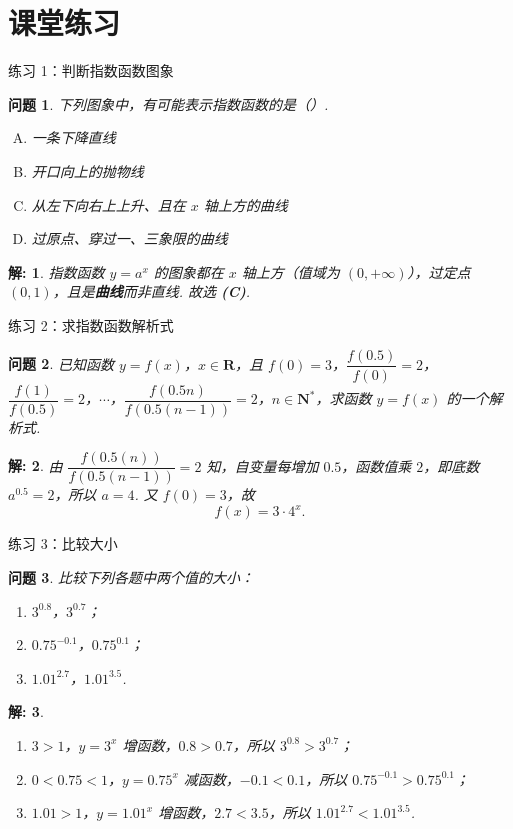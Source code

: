 \documentclass[aspectratio=169,13pt,t] {beamer}
\newtheorem{question}{问题}
\newtheorem*{solve}{解:}
\theoremstyle{definition}
\begin{document}
\section{课堂练习}

\begin{frame}{练习 1：判断指数函数图象}
	\begin{question}
		下列图象中，有可能表示指数函数的是（\quad ）.
		\begin{enumerate}[(A)]
			\item 一条下降直线
			\item 开口向上的抛物线
			\item 从左下向右上上升、且在 \(x\) 轴上方的曲线
			\item 过原点、穿过一、三象限的曲线
		\end{enumerate}
	\end{question}
	\pause
	\begin{solve}
		指数函数 \(y=a^x\) 的图象都在 \(x\) 轴上方（值域为 \((0,+\infty)\)），过定点 \((0,1)\)，且是\textbf{曲线}而非直线. 故选 \textbf{(C)}.
	\end{solve}
\end{frame}

\begin{frame}{练习 2：求指数函数解析式}
	\begin{question}
		已知函数 \(y=f(x)\)，\(x\in \mathbf{R}\)，且 \(f(0)=3\)，\(\dfrac{f(0.5)}{f(0)}=2\)，\(\dfrac{f(1)}{f(0.5)}=2\)，\(\cdots\)，\(\dfrac{f(0.5n)}{f(0.5(n-1))}=2\)，\(n\in \mathbf{N}^{*}\)，求函数 \(y=f(x)\) 的一个解析式.
	\end{question}
	\pause
	\begin{solve}
		由 \(\dfrac{f(0.5(n))}{f(0.5(n-1))}=2\) 知，自变量每增加 \(0.5\)，函数值乘 \(2\)，即底数 \(a^{0.5}=2\)，所以 \(a=4\). 又 \(f(0)=3\)，故
		\[
			f(x)=3\cdot 4^x.
		\]
	\end{solve}
\end{frame}

\begin{frame}{练习 3：比较大小}
	\begin{question}
		比较下列各题中两个值的大小：
		\begin{enumerate}[(1)]
			\item \(3^{0.8}\)，\(3^{0.7}\)；
			\item \(0.75^{-0.1}\)，\(0.75^{0.1}\)；
			\item \(1.01^{2.7}\)，\(1.01^{3.5}\).
		\end{enumerate}
	\end{question}
	\pause
	\begin{solve}
		\begin{enumerate}[(1)]
			\item \(3>1\)，\(y=3^x\) 增函数，\(0.8>0.7\)，所以 \(3^{0.8}>3^{0.7}\)；
			\item \(0<0.75<1\)，\(y=0.75^x\) 减函数，\(-0.1<0.1\)，所以 \(0.75^{-0.1}>0.75^{0.1}\)；
			\item \(1.01>1\)，\(y=1.01^x\) 增函数，\(2.7<3.5\)，所以 \(1.01^{2.7}<1.01^{3.5}\).
		\end{enumerate}
	\end{solve}
\end{frame}
\end{document}
